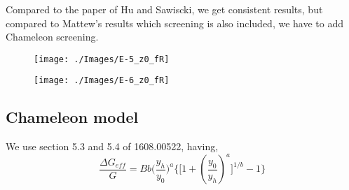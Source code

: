 \documentclass[a4paper,10pt]{article}
\def\be{\begin{equation}}
\def\ee{\end{equation}}
\begin{document}
     Compared to the paper of Hu and Sawiscki, we get consistent results, but compared to Mattew's results which screening is also included, we have to add Chameleon screening.
         \begin{figure}[H]
 \texttt{[image: ./Images/E-5\_z0\_fR]}  
 \end{figure} 
     \begin{figure}[H]
 \texttt{[image: ./Images/E-6\_z0\_fR]}  
 \end{figure} 
   

\subsection{Chameleon model}
We use section 5.3 and 5.4 of 1608.00522, having,
\be
\frac{\Delta G_{eff}}{G} = B b \Big (\frac{y_h}{y_0} \Big)^a \Big\{ \big[ 1+ (\frac{y_0}{y_h})^a \big]^{1/b}  -1 \Big\}
\ee
\end{document}
